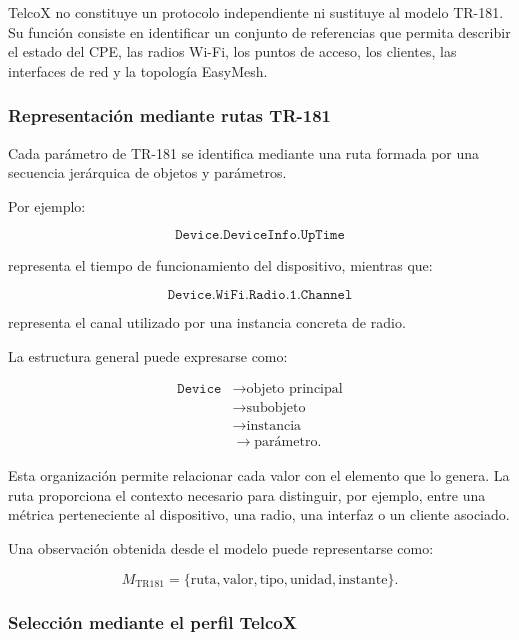 TelcoX no constituye un protocolo independiente ni sustituye al modelo
TR-181. Su función consiste en identificar un conjunto de referencias
que permita describir el estado del CPE, las radios Wi-Fi, los puntos de
acceso, los clientes, las interfaces de red y la topología EasyMesh.


\subsubsection*{Representación mediante rutas TR-181}

Cada parámetro de TR-181 se identifica mediante una ruta formada por una
secuencia jerárquica de objetos y parámetros.

Por ejemplo:

\[
    \texttt{Device.DeviceInfo.UpTime}
\]

representa el tiempo de funcionamiento del dispositivo, mientras que:

\[
    \texttt{Device.WiFi.Radio.1.Channel}
\]

representa el canal utilizado por una instancia concreta de radio.

La estructura general puede expresarse como:

\[
\begin{aligned}
    \texttt{Device}
    &\longrightarrow
    \text{objeto principal}\\
    &\longrightarrow
    \text{subobjeto}\\
    &\longrightarrow
    \text{instancia}\\
    &\longrightarrow
    \text{parámetro}.
\end{aligned}
\]

Esta organización permite relacionar cada valor con el elemento que lo
genera. La ruta proporciona el contexto necesario para distinguir, por
ejemplo, entre una métrica perteneciente al dispositivo, una radio, una
interfaz o un cliente asociado.

Una observación obtenida desde el modelo puede representarse como:

\[
    M_{\mathrm{TR181}}
    =
    \{
        \text{ruta},
        \text{valor},
        \text{tipo},
        \text{unidad},
        \text{instante}
    \}.
\]


\subsubsection*{Selección mediante el perfil TelcoX}


